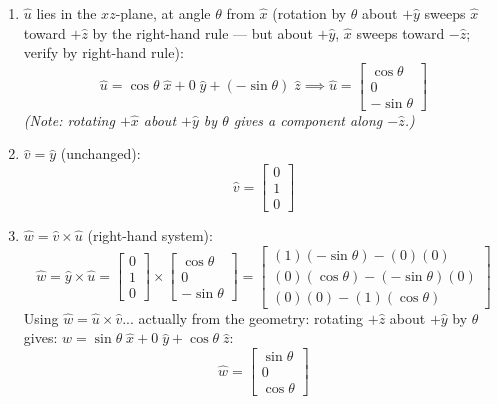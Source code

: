 \documentclass[12pt,a3paper]{article}
\begin{document}
\begin{enumerate}
\begin{tcolorbox}[enhanced,breakable,ansbox,colback=cB!4,colframe=cB,
  boxrule=0.8pt,arc=5pt,
  title={\textbf{Answer}},fonttitle=\bfseries\color{white},
  colbacktitle=cB]
\begin{enumerate}[label=\textbf{\arabic*.}]
  \item $\hat{u}$ lies in the $xz$-plane, at angle $\theta$ from
    $\hat{x}$ (rotation by $\theta$ about $+\hat{y}$ sweeps $\hat{x}$
    toward $+\hat{z}$ by the right-hand rule — but about $+\hat{y}$,
    $\hat{x}$ sweeps toward $-\hat{z}$; verify by right-hand rule):
    \[
      \hat{u} = \cos\theta\;\hat{x} + 0\;\hat{y} + (-\sin\theta)\;\hat{z}
      \implies \hat{u} = \begin{bmatrix}\cos\theta\\0\\-\sin\theta\end{bmatrix}
    \]
    \textit{(Note: rotating $+\hat{x}$ about $+\hat{y}$ by $\theta$
    gives a component along $-\hat{z}$.)}

  \item $\hat{v} = \hat{y}$ (unchanged):
    \[
      \hat{v} = \begin{bmatrix}0\\1\\0\end{bmatrix}
    \]

  \item $\hat{w} = \hat{v}\times\hat{u}$ (right-hand system):
    \[
      \hat{w} = \hat{y}\times\hat{u}
      = \begin{bmatrix}0\\1\\0\end{bmatrix}
        \times\begin{bmatrix}\cos\theta\\0\\-\sin\theta\end{bmatrix}
      = \begin{bmatrix}
          (1)(-\sin\theta)-(0)(0)\\
          (0)(\cos\theta)-(-\sin\theta)(0)\\
          (0)(0)-(1)(\cos\theta)
        \end{bmatrix}
    \]
    Using $\hat{w} = \hat{u}\times\hat{v}$... actually from the
    geometry: rotating $+\hat{z}$ about $+\hat{y}$ by $\theta$ gives:
    $\hat{w} = \sin\theta\;\hat{x} + 0\;\hat{y} + \cos\theta\;\hat{z}$:
    \[
      \hat{w} = \begin{bmatrix}\sin\theta\\0\\\cos\theta\end{bmatrix}
    \]
\end{enumerate}


\end{tcolorbox}
\end{enumerate}
\end{document}
